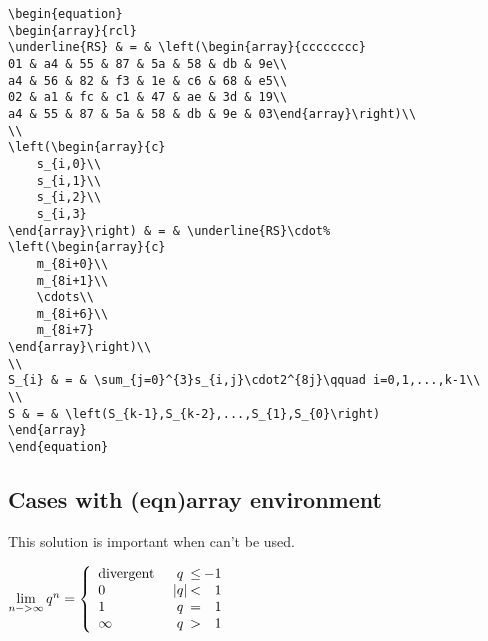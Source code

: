 \begin{table}[htb]
\begin{lstlisting}
\begin{equation}
\begin{array}{rcl}
\underline{RS} & = & \left(\begin{array}{cccccccc}
01 & a4 & 55 & 87 & 5a & 58 & db & 9e\\
a4 & 56 & 82 & f3 & 1e & c6 & 68 & e5\\
02 & a1 & fc & c1 & 47 & ae & 3d & 19\\
a4 & 55 & 87 & 5a & 58 & db & 9e & 03\end{array}\right)\\
\\
\left(\begin{array}{c}
	s_{i,0}\\
	s_{i,1}\\
	s_{i,2}\\
	s_{i,3}
\end{array}\right) & = & \underline{RS}\cdot%
\left(\begin{array}{c}
	m_{8i+0}\\
	m_{8i+1}\\
	\cdots\\
	m_{8i+6}\\
	m_{8i+7}
\end{array}\right)\\
\\
S_{i} & = & \sum_{j=0}^{3}s_{i,j}\cdot2^{8j}\qquad i=0,1,...,k-1\\
\\
S & = & \left(S_{k-1},S_{k-2},...,S_{1},S_{0}\right)
\end{array}
\end{equation}
\end{lstlisting}


\subsection{Cases with (eqn)array environment}

This solution is important when \AmSmath can't be used.    %

$\lim\limits_{n->\infty}q^{n}=\left\{%
	\begin{array}{lc@{\kern2pt}c@{\kern2pt}r}
		\textrm{divergent}\  & q & \le & -1\\
		0 & |q| & < & 1\\
		1 &  q  & = & 1\\
		\infty  & q & > & 1
	\end{array}\right.$


\end{table}
